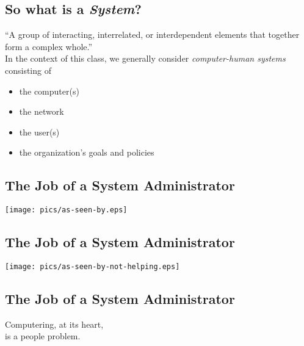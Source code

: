 \documentclass[xga]{xdvislides}
\begin{document}
\subsection{So what is a {\em System}?}
``A group of interacting, interrelated, or interdependent elements that
together form a complex whole.''
\\

In the context of this class, we generally consider {\em computer-human
systems} consisting of

\begin{itemize}
	\item the computer(s)
	\item the network
\end{itemize}
\vspace{.2in}

\begin{itemize}
	\item the user(s)
	\item the organization's goals and policies
\end{itemize}

\subsection{The Job of a System Administrator}
\vspace*{\fill}
\begin{center}
	\texttt{[image: pics/as-seen-by.eps]} \\
\end{center}
\vspace*{\fill}

\subsection{The Job of a System Administrator}
\vspace*{\fill}
\begin{center}
	\texttt{[image: pics/as-seen-by-not-helping.eps]} \\
\end{center}
\vspace*{\fill}

\subsection{The Job of a System Administrator}
\Huge
\vspace*{\fill}
\begin{center}
Computering, at its heart,\\
is a people problem.
\end{center}
\vspace*{\fill}
\Normalsize
\end{document}
